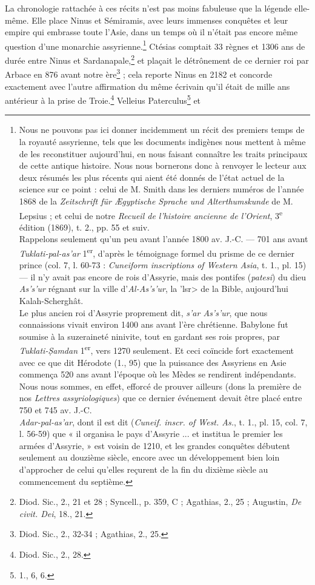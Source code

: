 \documentclass[a4paper, 11pt, oneside]{article}
\begin{document}
La chronologie rattachée à ces récits n'est pas moins fabuleuse que la légende elle-même. Elle place Ninus et Sémiramis, avec leurs immenses conquêtes et leur empire qui embrasse toute l'Asie, dans un temps où il n'était pas encore même question d'une monarchie assyrienne.\footnote{Nous ne pouvons pas ici donner incidemment un récit des premiers temps de la royauté assyrienne, tels que les documents indigènes nous mettent à même de les reconstituer aujourd'hui, en nous faisant connaître les traits principaux de cette antique histoire. Nous nous bornerons donc à renvoyer le lecteur aux deux résumés les plus récents qui aient été donnés de l'état actuel de la science sur ce point : celui de M. Smith dans les derniers numéros de l'année 1868 de la \emph{Zeitschrift für Ægyptische Sprache und Alterthumskunde} de M. Lepsius ; et celui de notre \emph{Recueil de l'histoire ancienne de l'Orient}, 3\textsuperscript{e} édition (1869), t. 2., pp. 55 et suiv.\\\hspace*{5mm}Rappelons seulement qu'un peu avant l'année 1800 av. J.-C. --- 701 ans avant \emph{Tuklati-pal-as'ar} 1\textsuperscript{er}, d'après le témoignage formel du prisme de ce dernier prince (col. 7, l. 60-73 : \emph{Cuneiform inscriptions of Western Asia}, t. 1., pl. 15) --- il n'y avait pas encore de rois d'Assyrie, mais des pontifes (\emph{patesi}) du dieu \emph{As's'ur} régnant sur la ville d'\emph{Al-As's'ur}, la \<'lsr> de la Bible, aujourd'hui Kalah-Scherghât.\\\hspace*{5mm}Le plus ancien roi d'Assyrie proprement dit, \emph{s'ar As's'ur}, que nous connaissions vivait environ 1400 ans avant l'ère chrétienne. Babylone fut soumise à la suzeraineté ninivite, tout en gardant ses rois propres, par \emph{Tuklati-\d{S}amdan} 1\textsuperscript{er}, vers 1270 seulement. Et ceci coïncide fort exactement avec ce que dit Hérodote (1., 95) que la puissance des Assyriens en Asie commença 520 ans avant l'époque où les Mèdes se rendirent indépendants. Nous nous sommes, en effet, efforcé de prouver ailleurs (dons la première de nos \emph{Lettres assyriologiques}) que ce dernier événement devait être placé entre 750 et 745 av. J.-C.\\\hspace*{5mm}\emph{Adar-pal-as'ar}, dont il est dit (\emph{Cuneif. inscr. of West. As.}, t. 1., pl. 15, col. 7, l. 56-59) que « il organisa le pays d'Assyrie ... et institua le premier les armées d'Assyrie, » est voisin de 1210, et les grandes conquêtes débutent seulement au douzième siècle, encore avec un développement bien loin d'approcher de celui qu'elles reçurent de la fin du dixième siècle au commencement du septième.} Ctésias comptait 33 règnes et 1306 ans de durée entre Ninus et Sardanapale,\footnote{Diod. Sic., 2., 21 et 28 ; Syncell., p. 359, C ; Agathias, 2., 25 ; Augustin, \emph{De civit. Dei}, 18., 21.} et plaçait le détrônement de ce dernier roi par Arbace en 876 avant notre ère\footnote{Diod. Sic., 2., 32-34 ; Agathias, 2., 25.} ; cela reporte Ninus en 2182 et concorde exactement avec l'autre affirmation du même écrivain qu'il était de mille ans antérieur à la prise de Troie.\footnote{Diod. Sic., 2., 28.} Velleius Paterculus\footnote{1., 6, 6.} et 
\end{document}
